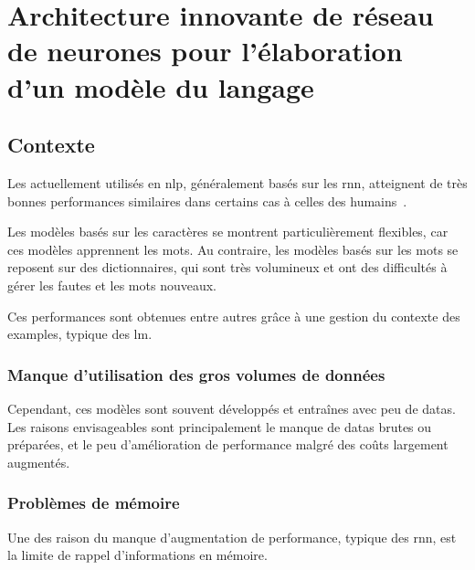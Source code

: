 
\chapter[Architecture innovante de réseau de neurones pour un modèle du langage]{Architecture innovante de réseau de neurones pour l'élaboration d'un modèle du langage\label{ch:project_gmsnn}}
\section{Contexte}
Les  actuellement utilisés en \gls{nlp}, généralement basés sur les \gls{rnn}, atteignent de très bonnes performances similaires dans certains cas à celles des humains~\autocite{rnn_perf,JozefowiczVSSW16,UnreasonableRNN}.

Les modèles basés sur les caractères se montrent particulièrement flexibles, car ces modèles \og apprennent\fg{} les mots. Au contraire, les modèles basés sur les mots se reposent sur des dictionnaires, qui sont très volumineux et ont des difficultés à gérer les fautes et les mots nouveaux.

Ces performances sont obtenues entre autres grâce à une gestion du contexte des \glspl{example}, typique des \gls{lm}.

\subsection{Manque d'utilisation des gros volumes de données}
Cependant, ces modèles sont souvent développés et entraînes avec peu de \glspl{data}.
Les raisons envisageables sont principalement le manque de \glspl{data} brutes ou préparées, et le peu d'amélioration de performance malgré des coûts largement augmentés.

\subsection{Problèmes de mémoire}\label{subsec:mempb}
Une des raison du manque d'augmentation de performance, typique des \gls{rnn}, est la limite de rappel d'informations en mémoire. %

